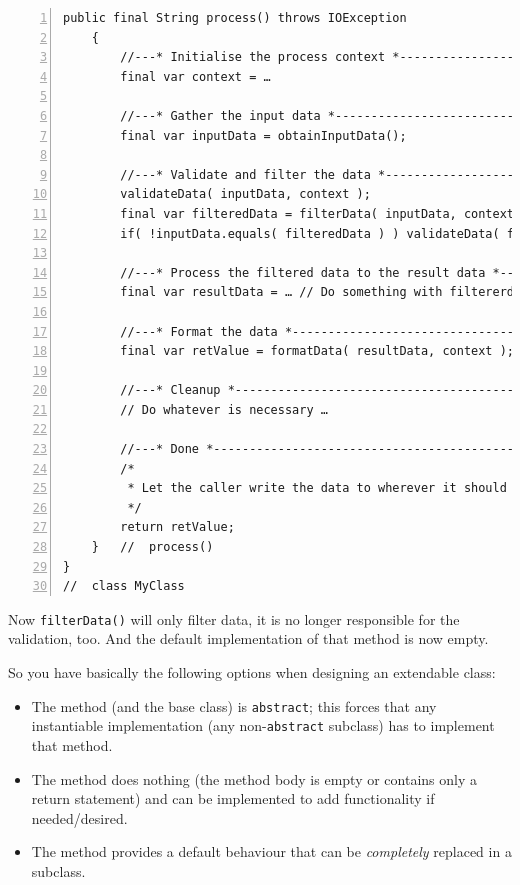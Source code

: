 \documentclass[11pt,a4paper, titlepage, parskip=half, headsepline, footsepline, cleardoublepage=current, headheight=1cm]{scrbook}
\begin{document}
\begin{lstlisting}[numbers=left]
    public final String process() throws IOException
    {
        //---* Initialise the process context *----------------------
        final var context = …
        
        //---* Gather the input data *-------------------------------
        final var inputData = obtainInputData();
        
        //---* Validate and filter the data *------------------------
        validateData( inputData, context );
        final var filteredData = filterData( inputData, context );
        if( !inputData.equals( filteredData ) ) validateData( filteredData, context );
        
        //---* Process the filtered data to the result data *--------
        final var resultData = … // Do something with filtererdData
        
        //---* Format the data *-------------------------------------
        final var retValue = formatData( resultData, context );
        
        //---* Cleanup *---------------------------------------------
        // Do whatever is necessary …
        
        //---* Done *------------------------------------------------
        /*
         * Let the caller write the data to wherever it should end up.
         */
        return retValue; 
    }   //  process()
}
//  class MyClass
\end{lstlisting}

Now \lstinline|filterData()| will only filter data, it is no longer responsible for the validation, too. And the default implementation of that method is now empty.

So you have basically the following options when designing an extendable class:
\begin{itemize}
\item{The method (and the base class) is \lstinline|abstract|; this forces that any instantiable implementation (any non-\lstinline|abstract| subclass) has to implement that method.}

\item{The method does nothing (the method body is empty or contains only a return statement) and can be implemented to add functionality if needed/desired.}

\item{The method provides a default behaviour that can be \textit{completely} replaced in a subclass.}
\end{itemize}
\end{document}
